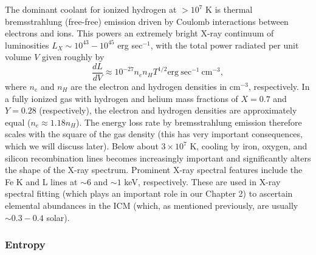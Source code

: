  
The dominant coolant for ionized hydrogen at $>10^7$ K is thermal bremsstrahlung (free-free) emission 
driven by Coulomb interactions between electrons and ions. This powers an extremely bright X-ray continuum
of luminosities $L_X \sim 10^{43}-10^{45}$ erg sec$^{-1}$, 
with the total power radiated per unit volume $V$ given roughly by 
\begin{equation}
\frac{dL}{dV} \approx 10^{-27} n_e n_H T^{1/2} \mathrm{erg~sec^{-1}~cm^{-3}},
\label{equation:brem}
\end{equation}
where $n_e$ and $n_H$ are the electron and hydrogen densities in cm$^{-3}$, respectively.
In a fully ionized gas with hydrogen and helium mass fractions of $X=0.7$ and $Y=0.28$ (respectively), 
the electron and hydrogen densities are approximately equal ($n_e\approx 1.18 n_H$). 
The energy loss rate by bremsstrahlung emission therefore scales with the square of the gas density 
(this has very important consequences, which we will discuss later).
Below about $3\times10^7$ K, cooling by iron, oxygen, and silicon recombination lines becomes increasingly important 
and significantly alters the shape of the X-ray spectrum. Prominent X-ray spectral features include the Fe K and L lines at $\sim 6$ and $\sim 1$ keV, 
respectively. These are used in X-ray spectral fitting (which plays an important role in our Chapter 2) to ascertain elemental abundances in the ICM 
(which, as mentioned previously, are usually $\sim 0.3-0.4$ solar). 





\subsubsection{{\bf Entropy}}



